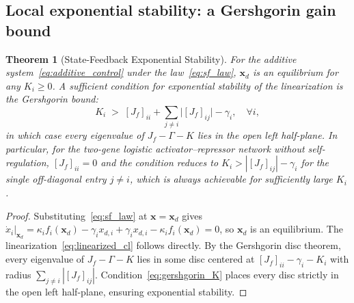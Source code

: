 \documentclass[12pt]{article}
\newtheorem{theorem}{Theorem}
\begin{document}
\subsection{Local exponential stability: a Gershgorin gain bound}
\label{sec:sf_local}

\begin{theorem}[State-Feedback Exponential Stability]
\label{thm:sf_stability}
For the additive system~\eqref{eq:additive_control} under the law~\eqref{eq:sf_law},
$\mathbf{x}_d$ is an equilibrium for any $K_i\geq 0$. A sufficient condition for
exponential stability of the linearization is the Gershgorin bound:
\begin{equation}
K_i \;>\; [J_f]_{ii}+\sum_{j\neq i}\bigl|[J_f]_{ij}\bigr|-\gamma_i,
\quad\forall i,
\label{eq:gershgorin_K}
\end{equation}
in which case every eigenvalue of $J_f-\Gamma-K$ lies in the open left half-plane.
In particular, for the two-gene logistic activator--repressor network without
self-regulation, $[J_f]_{ii}=0$ and the condition reduces to
$K_i>|[J_f]_{ij}|-\gamma_i$ for the single off-diagonal entry $j\neq i$, which is
always achievable for sufficiently large $K_i$.
\end{theorem}

\begin{proof}
Substituting~\eqref{eq:sf_law} at $\mathbf{x}=\mathbf{x}_d$ gives
$\dot{x}_i\big|_{\mathbf{x}_d}=\kappa_i f_i(\mathbf{x}_d)-\gamma_i x_{d,i}
+\gamma_i x_{d,i}-\kappa_i f_i(\mathbf{x}_d)=0$, so $\mathbf{x}_d$ is an equilibrium.
The linearization~\eqref{eq:linearized_cl} follows directly. By the Gershgorin
disc theorem, every eigenvalue of $J_f-\Gamma-K$ lies in some disc centered at
$[J_f]_{ii}-\gamma_i-K_i$ with radius $\sum_{j\neq i}|[J_f]_{ij}|$.
Condition~\eqref{eq:gershgorin_K} places every disc strictly in the open left
half-plane, ensuring exponential stability.
\end{proof}
\end{document}
